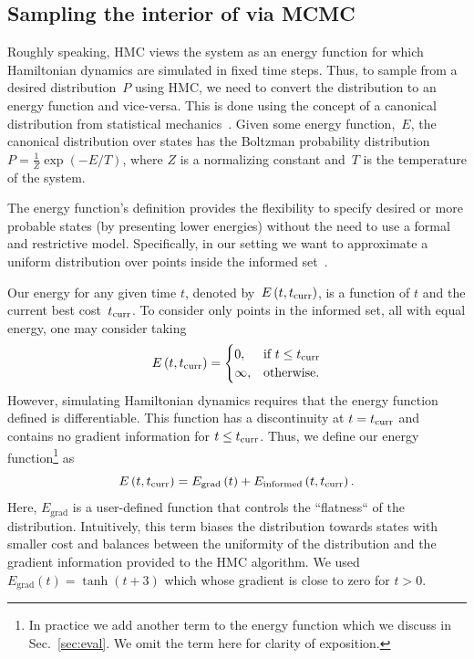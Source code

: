 \documentclass[letterpaper, 10 pt, conference]{ieeeconf}  %
\begin{document}
\subsection{Sampling the interior of \Cinf via
MCMC}
\label{subsec:mcmc}

	Roughly speaking, HMC views the system as an energy function for which Hamiltonian dynamics are simulated in fixed time steps.
	Thus, to sample from a desired distribution~$P$ using HMC, we need to convert the distribution to an energy function and vice-versa.
	This is done using the concept of a canonical distribution from statistical mechanics~\cite{N11}. 
	Given some energy function,~$E$, the canonical distribution over states has the Boltzman probability distribution $P = \frac{1}{Z}\exp (-E/T)$, where $Z$ is a normalizing constant and~$T$ is the temperature of the system.

The energy function's definition provides the flexibility to specify desired or more probable states (by presenting lower energies) without the need to use a formal and restrictive model. 
Specifically, in our setting we want to approximate 
a uniform distribution over points inside the informed set~\Cinf.

Our energy for any given time $t$, 
denoted by~$E\left(t,t_{\rm{curr}} \right)$, 
is a function of $t$ and the current best cost~$t_{\rm{curr}}$.
To consider only points in the informed set, all with equal energy, one may consider taking 
$$
E\left(t,t_{\rm{curr}} \right) = 
\begin{cases}
    0,	& \text{if } t \leq t_{\rm{curr}}\\        
    \infty,  	& \text{otherwise}.
\end{cases}
$$
However, simulating Hamiltonian dynamics requires that the energy function defined is differentiable.
This function has a discontinuity at $t = t_{\rm{curr}}$ 
and contains no gradient information for $t \leq t_{\rm{curr}}$.
Thus, we define our energy function\footnote{In practice we add another term to the energy function which we discuss in Sec.~\ref{sec:eval}. We omit the term here for clarity of exposition.} as  
\begin{equation}
\label{eq:energy}
E\left( t, t_{\rm{curr}} \right) 
= 
E_{\text{grad}} \left( t \right) + 
E_{\text{informed}} \left( t,t_{\rm{curr}} \right).
\end{equation}
Here, $E_{\text{grad}}$ is a user-defined function that
controls the ``flatness`` of the distribution.
Intuitively, this term biases the distribution towards states with smaller cost and balances between the uniformity of the distribution and the gradient information provided to the HMC algorithm.
We used $E_{\text{grad}} (t) = \tanh(t + 3 )$ which whose gradient is close to zero for $t>0$.
\end{document}
